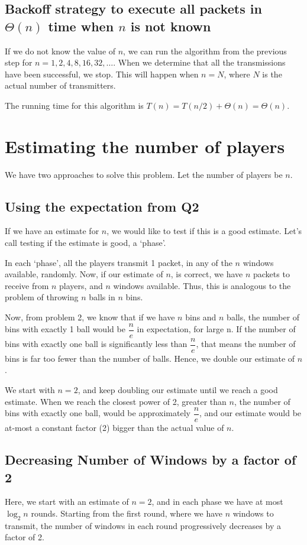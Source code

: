 \documentclass{article}
\begin{document}
\subsection{Backoff strategy to execute all packets in $\Theta(n)$ time when $n$ is \textbf{not known}}

If we do not know the value of $n$, we can run the algorithm from the
previous step for $n = 1, 2, 4, 8, 16, 32, \ldots{}$. When we
determine that all the transmissions have been successful, we
stop. This will happen when $n = N$, where $N$ is the actual number of
transmitters.

The running time for this algorithm is $T(n) = T(n/2) + \Theta(n) =
\Theta(n)$.

\clearpage

\section{Estimating the number of players}
We have two approaches to solve this problem. Let the number of 
players be $n$.

\subsection{Using the expectation from Q2}
If we have an estimate for $n$, we would like to test if this is a good
estimate. Let's call testing if the estimate is good, a `phase'.

In each `phase', all the players transmit 1 packet, in any of the
$n$ windows available, randomly. Now, if our estimate of $n$, is correct,
we have $n$ packets to receive from $n$ players, and $n$ windows available.
Thus, this is analogous to the problem of throwing $n$ balls in $n$ bins.

Now, from problem 2, we know that if we have $n$ bins and $n$ balls,
the number of bins with exactly 1 ball would be $\dfrac{n}{e}$ in
expectation, for large n. If the number of bins with exactly one ball
is significantly less than $\dfrac{n}{e}$, that means the number of
bins is far too fewer than the number of balls. Hence, we double our
estimate of $n$.

We start with $n = 2$, and keep doubling our estimate until we reach a
good estimate. When we reach the closest power of 2, greater than $n$,
the number of bins with exactly one ball, would be approximately
$\dfrac{n}{e}$, and our estimate would be at-most a constant factor
(2) bigger than the actual value of $n$.

\subsection{Decreasing Number of Windows by a factor of 2}
Here, we start with an estimate of $n = 2$, and in each phase we have
at most $\log_2{n}$ rounds. Starting from the first round, where we
have $n$ windows to transmit, the number of windows in each round
progressively decreases by a factor of 2.
\end{document}
